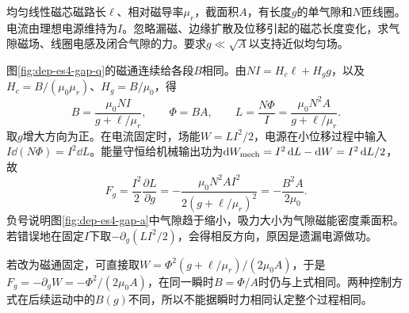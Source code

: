 \begin{example}[保持电流的电磁铁吸力]
均匀线性磁芯磁路长$\ell$、相对磁导率$\mu_r$，截面积$A$，有长度$g$的单气隙和$N$匝线圈。电流由理想电源维持为$I$。忽略漏磁、边缘扩散及位移引起的磁芯长度变化，求气隙磁场、线圈电感及闭合气隙的力。要求$g\ll\sqrt A$以支持近似均匀场。
\end{example}
\begin{solution}
图\ref{fig:dep-es4-gap-q}的磁通连续给各段$B$相同。由$NI=H_c\ell+H_gg$，以及$H_c=B/(\mu_0\mu_r)$、$H_g=B/\mu_0$，得
\[
 B=\frac{\mu_0NI}{g+\ell/\mu_r},\qquad
 \Phi=BA,\qquad L=\frac{N\Phi}{I}
 =\frac{\mu_0N^2A}{g+\ell/\mu_r}.
\]
取$g$增大方向为正。在电流固定时，场能$W=LI^2/2$，电源在小位移过程中输入$I\dd(N\Phi)=I^2\dd L$。能量守恒给机械输出功为$\mathop{}\!\mathrm d W_{\rm mech}=I^2\mathop{}\!\mathrm d L-\mathop{}\!\mathrm d W=I^2\mathop{}\!\mathrm d L/2$，故
\[
 F_g=\frac{I^2}{2}\frac{\partial L}{\partial g}
 =-\frac{\mu_0N^2AI^2}{2(g+\ell/\mu_r)^2}
 =-\frac{B^2A}{2\mu_0}.
\]
负号说明图\ref{fig:dep-es4-gap-a}中气隙趋于缩小，吸力大小为气隙磁能密度乘面积。若错误地在固定$I$下取$-\partial_g(LI^2/2)$，会得相反方向，原因是遗漏电源做功。

若改为磁通固定，可直接取$W=\Phi^2(g+\ell/\mu_r)/(2\mu_0A)$，于是$F_g=-\partial_gW=-\Phi^2/(2\mu_0A)$，在同一瞬时$B=\Phi/A$时仍与上式相同。两种控制方式在后续运动中的$B(g)$不同，所以不能据瞬时力相同认定整个过程相同。
\end{solution}
